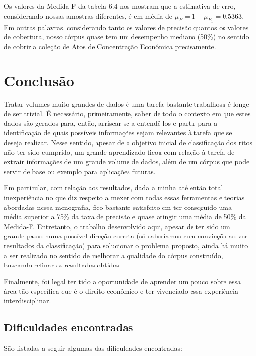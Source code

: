 \documentclass[11pt]{report}
\begin{document}
Os valores da Medida-F da tabela 6.4 nos mostram que a estimativa de erro, considerando nossas amostras diferentes, é em média de $\mu_{E} = 1 - \mu_{F_1} = 0.5363$. Em outras palavras,
considerando tanto os valores de precisão quantos os valores de cobertura, nosso córpus quase tem um desempenho mediano (50\%) no sentido de cobrir a coleção de Atos de Concentração Econômica precisamente.

\pagebreak
\chapter{Conclusão}

\indent\indent Tratar volumes muito grandes de dados é uma tarefa bastante trabalhosa é longe de ser trivial. É necessário, primeiramente, saber de todo o contexto
em que estes dados são gerados para, então, arriscar-se a entendê-los e partir para a identificação de quais possíveis informações sejam relevantes à tarefa que se deseja realizar. Nesse sentido, apesar de o objetivo inicial de classificação dos ritos não ter sido cumprido, um grande
aprendizado ficou com relação à tarefa de extrair informações de um grande volume de dados, além de um córpus que pode servir de base ou exemplo para aplicações futuras. 

Em particular, com relação aos resultados, dada a minha até então total inexperiência no que diz respeito a mexer com todas essas ferramentas e teorias abordadas nessa monografia, 
fico bastante satisfeito em ter conseguido uma  média superior a 75\% da taxa de precisão e quase atingir uma média de 50\% da Medida-F. Entretanto, o trabalho desenvolvido aqui, apesar de ter sido um grande passo numa possível direção correta (só saberíamos com convicção ao ver resultados da classificação) para solucionar o 
problema proposto, ainda há muito a ser realizado no sentido de melhorar a qualidade do córpus construído, buscando refinar os resultados obtidos.

Finalmente, foi legal ter tido a oportunidade de aprender um pouco sobre essa área tão específica que é o direito econômico e ter vivenciado essa experiência interdisciplinar.

\section{Dificuldades encontradas}

\indent\indent São listadas a seguir algumas das dificuldades encontradas:
\end{document}
